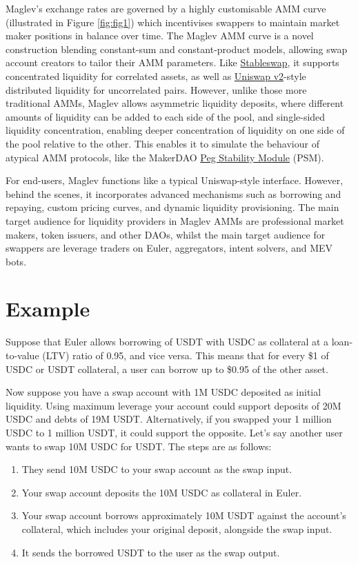 \documentclass{article}
\begin{document}
Maglev’s exchange rates are governed by a highly customisable AMM curve (illustrated in Figure \ref{fig:fig1}) which incentivises swappers to maintain market maker positions in balance over time. The Maglev AMM curve is a novel construction blending constant-sum and constant-product models, allowing swap account creators to tailor their AMM parameters. Like \href{https://berkeley-defi.github.io/assets/material/StableSwap.pdf}{Stableswap}, it supports concentrated liquidity for correlated assets, as well as \href{https://app.uniswap.org/whitepaper.pdf}{Uniswap v2}-style distributed liquidity for uncorrelated pairs. However, unlike those more traditional AMMs, Maglev allows asymmetric liquidity deposits, where different amounts of liquidity can be added to each side of the pool, and single-sided liquidity concentration, enabling deeper concentration of liquidity on one side of the pool relative to the other. This enables it to simulate the behaviour of atypical AMM protocols, like the MakerDAO \href{https://mips.makerdao.com/mips/details/MIP29}{Peg Stability Module} (PSM).

For end-users, Maglev functions like a typical Uniswap-style interface. However, behind the scenes, it incorporates advanced mechanisms such as borrowing and repaying, custom pricing curves, and dynamic liquidity provisioning. The main target audience for liquidity providers in Maglev AMMs are professional market makers, token issuers, and other DAOs, whilst the main target audience for swappers are leverage traders on Euler, aggregators, intent solvers, and MEV bots.  

\section{Example}

Suppose that Euler allows borrowing of USDT with USDC as collateral at a loan-to-value (LTV) ratio of 0.95, and vice versa. This means that for every \$1 of USDC or USDT collateral, a user can borrow up to \$0.95 of the other asset. 

Now suppose you have a swap account with 1M USDC deposited as initial liquidity. Using maximum leverage your account could support deposits of 20M USDC and debts of 19M USDT. Alternatively, if you swapped your 1 million USDC to 1 million USDT, it could support the opposite. Let’s say another user wants to swap 10M USDC for USDT. The steps are as follows:

\begin{enumerate}
    \item They send 10M USDC to your swap account as the swap input.
    \item Your swap account deposits the 10M USDC as collateral in Euler.
    \item Your swap account borrows approximately 10M USDT against the account's collateral, which includes your original deposit, alongside the swap input.
    \item It sends the borrowed USDT to the user as the swap output.
\end{enumerate}
\end{document}
